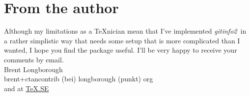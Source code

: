 \documentclass[a4paper,12pt,twoside,openany]{memoir}
\newcommand{\sfit}[1]{\textit{#1}}
\newcommand{\tpname}{\sfit{gitinfo2}}
\begin{document}
\section{From the author}
Although my limitations as a \TeX nician
mean that I've implemented \tpname\ in a rather simplistic way
that needs some setup that is more complicated than I wanted,
I hope you find the package useful.
I'll be very happy to receive your comments by email.\\[\baselineskip]
Brent Longborough\\[\baselineskip]
\textsf{brent+ctancontrib (bei) longborough (punkt) org}\\
and at \href{http://tex.stackexchange.com/users/344/brent-longborough}{\TeX.SE}
\clearpage
\raggedright
\printpagenotes
\end{document}
